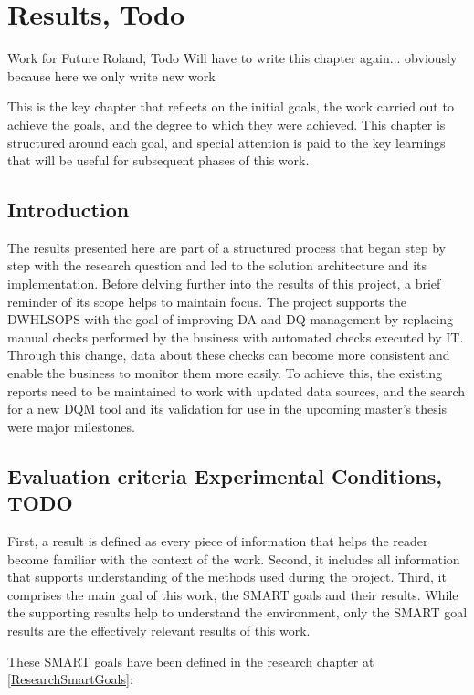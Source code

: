 \chapter{Results, Todo}
Work for Future Roland, Todo
Will have to write this chapter again... obviously because here we only write new work

This is the key chapter that reflects on the initial goals, the work carried out to achieve the goals, and the degree to which they were achieved. This chapter is structured around each goal, and special attention is paid to the key learnings that will be useful for subsequent phases of this work.



\section{Introduction}

The results presented here are part of a structured process that began step by step with the research question and led to the solution architecture and its implementation. Before delving further into the results of this project, a brief reminder of its scope helps to maintain focus. The project supports the \gls{DWHLSOPS} with the goal of improving \gls{DA} and \gls{DQ} management by replacing manual checks performed by the business with automated checks executed by IT. Through this change, data about these checks can become more consistent and enable the business to monitor them more easily. To achieve this, the existing reports need to be maintained to work with updated data sources, and the search for a new \gls{DQM} tool and its validation for use in the upcoming master's thesis were major milestones.



\section{Evaluation criteria Experimental Conditions, TODO}
First, a result is defined as every piece of information that helps the reader become familiar with the context of the work. Second, it includes all information that supports understanding of the methods used during the project. Third, it comprises the main goal of this work, the SMART goals and their results. While the supporting results help to understand the environment, only the SMART goal results are the effectively relevant results of this work.

These SMART goals have been defined in the research chapter at \ref{ResearchSmartGoals}:

